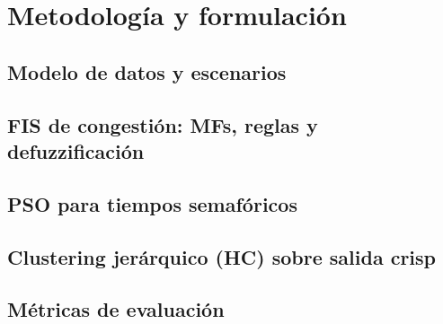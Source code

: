 \section{Metodología y formulación}\label{sec:metodologia}

\subsection{Modelo de datos y escenarios}\label{subsec:meto-datos}

\subsection{FIS de congestión: MFs, reglas y defuzzificación}\label{subsec:meto-fis}

\subsection{PSO para tiempos semafóricos}\label{subsec:meto-pso}

\subsection{Clustering jerárquico (HC) sobre salida crisp}\label{subsec:meto-hc}

\subsection{Métricas de evaluación}\label{subsec:meto-metricas}
